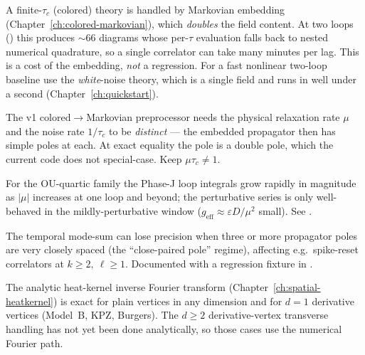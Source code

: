 \begin{description}[leftmargin=0pt,style=nextline]

  \item[Colored-noise two-loop runs are slow]
        A finite-$\tau_c$ (colored) theory is handled by Markovian embedding
        (Chapter~\ref{ch:colored-markovian}), which \emph{doubles} the field
        content.  At two loops () this produces $\sim$66 diagrams
        whose per-$\tau$ evaluation falls back to nested numerical quadrature, so
        a single correlator can take many minutes per lag.  This is a cost of the
        embedding, \emph{not} a regression.  For a fast nonlinear two-loop
        baseline use the \emph{white}-noise  theory, which is a
        single field and runs in well under a second
        (Chapter~\ref{ch:quickstart}).

  \item[$\mu=1/\tau_c$ exact degeneracy]
        The v1 colored$\to$Markovian preprocessor needs the physical relaxation
        rate $\mu$ and the noise rate $1/\tau_c$ to be \emph{distinct} --- the
        embedded propagator then has simple poles at each.  At exact equality the
        pole is a double pole, which the current code does not special-case.
        Keep $\mu\tau_c\neq 1$.

  \item[Large-$|\mu|$ OU-quartic blow-up at $\ell\ge1$]
        For the OU-quartic family the Phase-J loop integrals grow rapidly in
        magnitude as $|\mu|$ increases at one loop and beyond; the perturbative
        series is only well-behaved in the mildly-perturbative window
        ($g_{\mathrm{eff}}\approx\varepsilon D/\mu^2$ small).  See
        .

  \item[$m\ge3$ chain-simplex precision]
        The temporal mode-sum can lose precision when three or more propagator
        poles are very closely spaced (the ``close-paired pole'' regime),
        affecting e.g.\ spike-reset correlators at $k\ge2,\ \ell\ge1$.  Documented
        with a regression fixture in
        .

  \item[Spatial $d\ge2$ with derivative vertices is still numerical]
        The analytic heat-kernel inverse Fourier transform
        (Chapter~\ref{ch:spatial-heatkernel}) is exact for plain vertices in any
        dimension and for $d=1$ derivative vertices (Model~B, KPZ, Burgers).  The
        $d\ge2$ derivative-vertex transverse handling has not yet been done
        analytically, so those cases use the numerical Fourier path.


\end{description}
